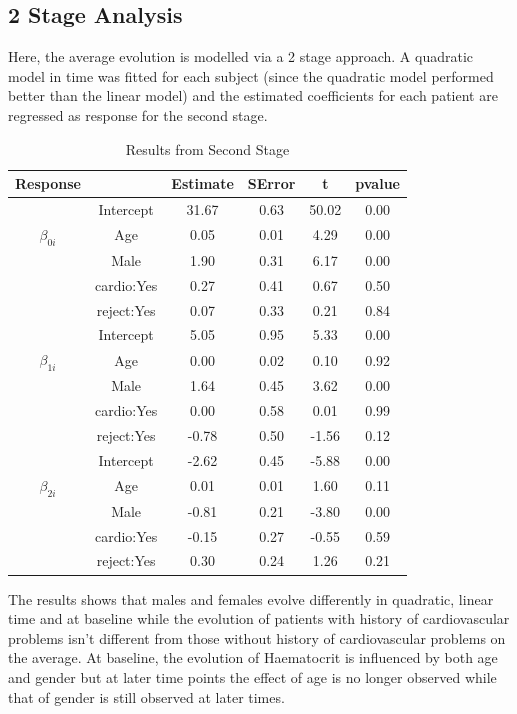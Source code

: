 \documentclass[11pt]{article}
\begin{document}
\subsection{2 Stage Analysis}
Here, the average evolution is modelled via a 2 stage approach. A quadratic model in time was fitted for each subject (since the quadratic model performed better than the linear model) and the estimated coefficients for each patient are regressed as response for the second stage. 
\begin{table}[H]
\centering
\begin{tabular}{cccccc}
\hline
Response &  & Estimate & SError & t & pvalue\\
\hline
 & Intercept & 31.67 & 0.63 & 50.02 & 0.00 \\ 
$\beta_{0i}$ &  Age & 0.05 & 0.01 & 4.29 & 0.00 \\ 
 &  Male & 1.90 & 0.31 & 6.17 & 0.00 \\ 
 &  cardio:Yes & 0.27 & 0.41 & 0.67 & 0.50 \\ 
 &  reject:Yes & 0.07 & 0.33 & 0.21 & 0.84 \\
\hline
 & Intercept & 5.05 & 0.95 & 5.33 & 0.00 \\ 
 $\beta_{1i}$& Age & 0.00 & 0.02 & 0.10 & 0.92  \\ 
 & Male & 1.64 & 0.45 & 3.62 & 0.00 \\ 
 & cardio:Yes & 0.00 & 0.58 & 0.01 & 0.99 \\ 
 & reject:Yes & -0.78 & 0.50 & -1.56 & 0.12 \\ 
 \hline
 & Intercept & -2.62 & 0.45 & -5.88 & 0.00 \\ 
 $\beta_{2i}$ & Age & 0.01 & 0.01 & 1.60 & 0.11 \\ 
 & Male & -0.81 & 0.21 & -3.80 & 0.00 \\ 
 & cardio:Yes & -0.15 & 0.27 & -0.55 & 0.59 \\ 
 & reject:Yes & 0.30 & 0.24 & 1.26 & 0.21\\
\hline
\end{tabular}
\caption{Results from Second Stage}
\end{table}

The results shows that males and females evolve differently in quadratic, linear time and at baseline while the evolution of patients with history of cardiovascular problems isn't different from those without history of cardiovascular problems on the average. At baseline, the evolution of Haematocrit is influenced by both age and gender but at later time points the effect of age is no longer observed while that of gender is still observed at later times.
\end{document}
